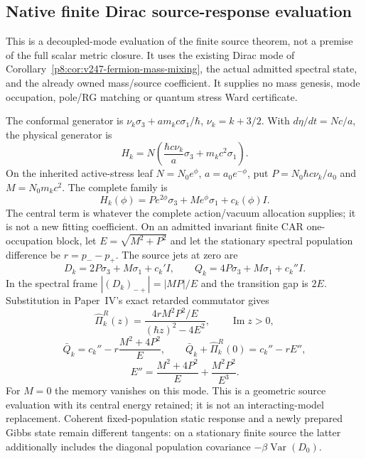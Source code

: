 \documentclass[12pt,a4paper]{article}
\begin{document}



\subsection{Native finite Dirac source-response evaluation}
\label{p8:app:v2147-finite-dirac-source-response}

This is a decoupled-mode evaluation of the finite source theorem, not a premise
of the full scalar metric closure.  It uses the existing Dirac mode of
Corollary~\ref{p8:cor:v247-fermion-mass-mixing}, the actual admitted spectral
state, and the already owned mass/source coefficient.  It supplies no mass
genesis, mode occupation, pole/RG matching or quantum stress Ward certificate.

The conformal generator is
$\nu_k\sigma_3+am_kc\sigma_1/\hbar$, $\nu_k=k+3/2$.
With $d\eta/dt=Nc/a$, the physical generator is
\[
 H_k=N\left(\frac{\hbar c\nu_k}{a}\sigma_3+m_kc^2\sigma_1\right).
\]
On the inherited active-stress leaf $N=N_0e^\phi$, $a=a_0e^{-\phi}$, put
$P=N_0\hbar c\nu_k/a_0$ and $M=N_0m_kc^2$.  The complete family is
\[
 H_k(\phi)=Pe^{2\phi}\sigma_3+Me^\phi\sigma_1+c_k(\phi)I.
\]
The central term is whatever the complete action/vacuum allocation supplies;
it is not a new fitting coefficient.  On an admitted invariant finite CAR
one-occupation block, let $E=\sqrt{M^2+P^2}$ and let the stationary spectral
population difference be $r=p_--p_+$.
The source jets at zero are
\[
 D_k=2P\sigma_3+M\sigma_1+c_k'I,
 \qquad Q_k=4P\sigma_3+M\sigma_1+c_k''I.
\]
In the spectral frame $|(D_k)_{-+}|=|MP|/E$ and the transition gap is $2E$.
Substitution in Paper~IV's exact retarded commutator gives
\[
 \widehat\Pi_k^R(z)
 =\frac{4rM^2P^2/E}{(\hbar z)^2-4E^2},\qquad \operatorname{Im}z>0,
\]
\[
 \bar Q_k=c_k''-r\frac{M^2+4P^2}{E},\qquad
 \bar Q_k+\widehat\Pi_k^R(0)=c_k''-rE'',
\]
\[
 E''=\frac{M^2+4P^2}{E}+\frac{M^2P^2}{E^3}.
\]
For $M=0$ the memory vanishes on this mode.  This is a geometric source
evaluation with its central energy retained; it is not an interacting-model
replacement.  Coherent fixed-population static response and a newly prepared
Gibbs state remain different tangents: on a stationary finite source the
latter additionally includes the diagonal population covariance
$-\beta\operatorname{Var}(D_0)$.
\end{document}
